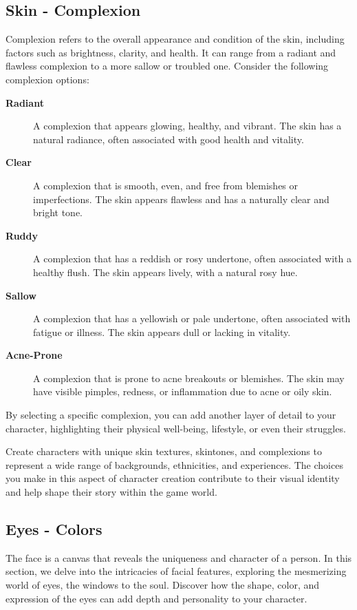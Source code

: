 \documentclass[12pt]{book}  %
\begin{document}
\subsection{\textbf{Skin  - Complexion}}

Complexion refers to the overall appearance and condition of the skin, including factors such as brightness, clarity, and health. It can range from a radiant and flawless complexion to a more sallow or troubled one. Consider the following complexion options:

\begin{description}
    \item[\textbf{Radiant}] A complexion that appears glowing, healthy, and vibrant. The skin has a natural radiance, often associated with good health and vitality.
    \item[\textbf{Clear}] A complexion that is smooth, even, and free from blemishes or imperfections. The skin appears flawless and has a naturally clear and bright tone.
    \item[\textbf{Ruddy}] A complexion that has a reddish or rosy undertone, often associated with a healthy flush. The skin appears lively, with a natural rosy hue.
    \item[\textbf{Sallow}] A complexion that has a yellowish or pale undertone, often associated with fatigue or illness. The skin appears dull or lacking in vitality.
    \item[\textbf{Acne-Prone}] A complexion that is prone to acne breakouts or blemishes. The skin may have visible pimples, redness, or inflammation due to acne or oily skin.
\end{description}

By selecting a specific complexion, you can add another layer of detail to your character, highlighting their physical well-being, lifestyle, or even their struggles.

Create characters with unique skin textures, skintones, and complexions to represent a wide range of backgrounds, ethnicities, and experiences. The choices you make in this aspect of character creation contribute to their visual identity and help shape their story within the game world.

\subsection{\textbf{Eyes - Colors}}

The face is a canvas that reveals the uniqueness and character of a person. In this section, we delve into the intricacies of facial features, exploring the mesmerizing world of eyes, the windows to the soul. Discover how the shape, color, and expression of the eyes can add depth and personality to your character.
\end{document}
